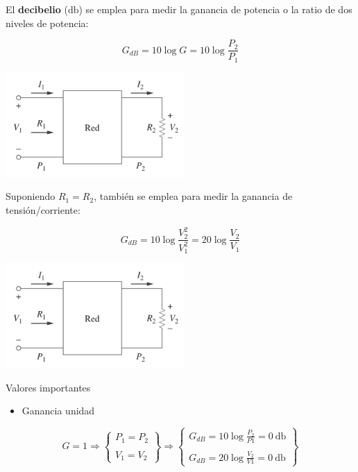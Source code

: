 El \textbf{decibelio} (\(\si{\decibel}\)) se emplea para medir la ganancia de potencia o la ratio de dos niveles de potencia:

\[
G_{dB} = 10 \log G = 10 \log \frac{P_2}{P_1}
\]
\begin{center}
\includegraphics[height=4cm]{../figs/Red_Ganancia.pdf}
\end{center}



Suponiendo \(R_1 = R_2\), también se emplea para medir la ganancia de tensión/corriente:

\[
G_{dB} = 10 \log \frac{V_2^2}{V_1^2} = 20 \log \frac{V_2}{V_1}
\]
\begin{center}
\includegraphics[height=4cm]{../figs/Red_Ganancia.pdf}
\end{center}

{Valores importantes}

\begin{itemize}
\item Ganancia unidad
\end{itemize}

\[
  G = 1 \Rightarrow
  \left\{
  \begin{array}{c}
    P_1 = P_2\\
    \\
    V_1 = V_2
  \end{array}
  \right\}
  \Rightarrow
  \left\{
  \begin{array}{c}
    G_{dB} = 10 \log \frac{P_2}{P1} = \SI{0}{\decibel}\\
    \\
    G_{dB} = 20 \log \frac{V_2}{V1} = \SI{0}{\decibel}
  \end{array}
  \right\}
\]

